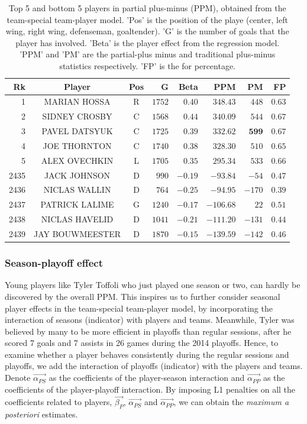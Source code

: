 {
	\renewcommand{\arraystretch}{1.2}
	\begin{table}[htbp]
		\centering
		\begin{tabular}{r c c r r r r r }
			\hline
			Rk & Player & Pos & G & Beta & \textbf{PPM} & PM & FP \\ \hline
			1 & MARIAN HOSSA 			& R & $1752$ & $0.40$ & $348.43$ & $448$ & $0.63$ \\
			2 & SIDNEY CROSBY  		   & C &  $1568$ & $0.44$ & $340.09$ & $544$ & $0.67$ \\
			3 & PAVEL DATSYUK  		   & C &  $1725$ & $0.39$ & $332.62$ & $\mathbf{599}$ & $0.67$ \\
			4 & JOE THORNTON 			& C & $1740$ & $0.38$ & $328.30$ & $510$ & $0.65$ \\
			5 & ALEX OVECHKIN  			& L &  $1705$ & $0.35$ &$295.34$ & $533$ & $0.66$ \\ \hline
	  2435 &  JACK JOHNSON   		& D  & $990$ & $-0.19$ & $ -93.84$ & $-54$ & $ 0.47$\\
	  2436 &  NICLAS WALLIN   		& D  & $764$ & $-0.25$ & $ -94.95$ & $-170$ & $ 0.39$\\
	  2437 &  PATRICK LALIME  		& G & $1240$ & $-0.17$ & $ -106.68$ & $ 22$ & $ 0.51$\\
	  2438 & NICLAS HAVELID  		& D & $1041$ & $-0.21$ & $ -111.20$ & $-131$ & $ 0.44 $\\
	  2439 &  JAY BOUWMEESTER  		& D & $1870$ & $-0.15$ & $ -139.59$ & $-142$ & $ 0.46$\\ \hline
		\end{tabular}
		\caption{Top 5 and bottom 5 players in partial plus-minus (PPM), obtained from the team-special team-player model. 'Pos' is the position of the playe (center, left wing, right wing, defenseman, goaltender). 'G' is the number of goals that the player has involved. 'Beta' is the player effect from the regression model. 'PPM' and 'PM' are the partial-plus minus and traditional plus-minus statistics respectively. 'FP' is the for percentage.  }\label{tab:goal.ppm.rank}
	\end{table}
}


\subsubsection{Season-playoff effect}
Young players like Tyler Toffoli who just played one season or two, can hardly be discovered by the overall PPM. This inspires us to further consider seasonal player effects in the team-special team-player model, by incorporating the interaction of seasons (indicator) with players and teams. Meanwhile, Tyler was believed by many to be more efficient in playoffs than regular sessions, after he scored 7 goals and 7 assists in 26 games during the 2014 playoffs. Hence, to examine whether a player behaves consistently during the regular sessions and playoffs, we add the interaction of playoffs (indicator) with the players and teams. Denote $\vec{\alpha_{PS}}$ as the coefficients of the player-season interaction and $\vec{\alpha_{PP}}$ as the coefficients of the player-playoff interaction. By imposing L1 penalties on all the coefficients related to players, $\vec{\beta_P}$, $\vec{\alpha_{PS}}$ and $\vec{\alpha_{PP}}$, we can obtain the {\em maximum a posteriori} estimates.

